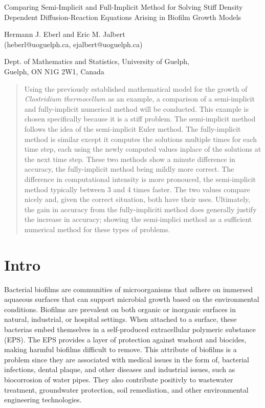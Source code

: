 \documentclass{article}
\theoremstyle{plain}
\begin{document}
\begin{center}
{\Large{Comparing Semi-Implicit and Full-Implicit Method for Solving Stiff Density Dependent Diffusion-Reaction Equations Arising in Biofilm Growth Models}}

\vspace{10pt}

{{Hermann J. Eberl and Eric M. Jalbert\\
  (heberl@uoguelph.ca, ejalbert@uoguelph.ca)\\}}
  
  {{Dept. of Mathematics and Statistics, University of Guelph,\\ 
  Guelph, ON N1G 2W1, Canada}}
\end{center}

\begin{abstract}
  Using the previously established mathematical model for the growth of \textit{Clostridium thermocellum} as an example, a comparison of a semi-implicit and fully-implicit numerical method will be conducted.
  This example is chosen specifically because it is a stiff problem.
  The semi-implicit method follows the idea of the semi-implicit Euler method.
  The fully-implicit method is similar except it computes the solutions multiple times for each time step, each using the newly computed values inplace of the solutions at the next time step.
  These two methods show a minute difference in accuracy, the fully-implicit method being mildly more correct.
  The difference in computational intensity is more pronouced, the semi-implicit method typically between 3 and 4 times faster. 
  The two values compare nicely and, given the correct situation, both have their uses.
  Ultimately, the gain in accuracy from the fully-impliciti method does generally justify the increase in accuracy; showing the semi-implici method as a sufficient numerical method for these types of problems.
\end{abstract}

\section{Intro}
  Bacterial biofilms are communities of microorganisms that adhere on immersed aquaeous surfaces that can support microbial growth based on the environmental conditions. 
  Biofilms are prevalent on both organic or inorganic surfaces in natural, industrial, or hospital settings.
  When attached to a surface, these bacterias embed themselves in a self-produced extracellular polymeric substance (EPS).
  The EPS provides a layer of protection against washout and biocides, making harmful biofilms difficult to remove.
  This attribute of biofilms is a problem since they are associated with medical issues in the form of, bacterial infections, dental plaque, and other diseases and industrial issues, such as biocorrosion of water pipes. 
  They also contribute positivly to wastewater treatment, groundwater protection, soil remediation, and other environmental engineering technologies.
  
\end{document}
